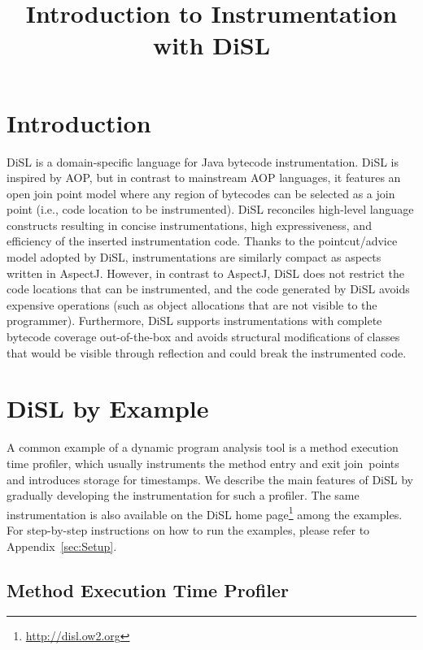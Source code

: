 \documentclass{article}
\begin{document}
\title{Introduction to Instrumentation with DiSL}

\maketitle

\section{Introduction}

DiSL is a domain-specific language for Java bytecode instrumentation.
DiSL is inspired by AOP, but in contrast to mainstream AOP languages, it features an open join point model where any region of bytecodes can be selected as a join point (i.e., code location to be instrumented).
DiSL reconciles high-level language constructs resulting in concise instrumentations, high expressiveness, and efficiency of the inserted instrumentation code.
Thanks to the pointcut/advice model adopted by DiSL, instrumentations are similarly compact as aspects written in AspectJ.
However, in contrast to AspectJ, DiSL does not restrict the code locations that can be instrumented, and the code generated by DiSL avoids expensive operations (such as object allocations that are not visible to the programmer).
Furthermore, DiSL supports instrumentations with complete bytecode coverage out-of-the-box and avoids structural modifications of classes that would be visible through reflection and could break the instrumented code.


\section{DiSL by Example}\label{sec:DiSL}

A common example of a dynamic program analysis tool is a method execution time profiler, which usually instruments the method entry and exit join~points and introduces storage for timestamps.
We describe the main features of DiSL by gradually developing the instrumentation for such a profiler.
The same instrumentation is also available on the DiSL home page\footnote{\url{http://disl.ow2.org}} among the examples.
For step-by-step instructions on how to run the examples, please refer to Appendix~\ref{sec:Setup}.


\subsection{Method Execution Time Profiler}
\end{document}
